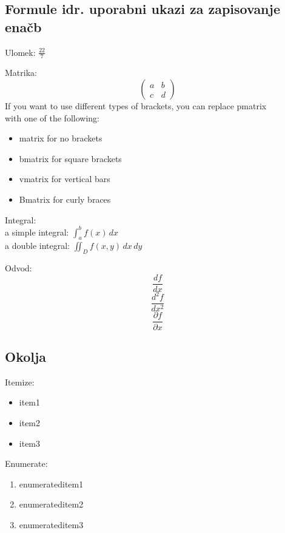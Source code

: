 \documentclass[a4paper]{article}
\begin{document}
\subsection{Formule idr. uporabni ukazi za zapisovanje enačb}
\begin{raggedright}
Ulomek: 
$\frac{22}{7}$ \\
\end{raggedright}

Matrika:
\[
\begin{pmatrix}
a & b \\
c & d
\end{pmatrix}
\]
%
%
If you want to use different types of brackets, you can replace pmatrix \\
with one of the following:
\begin{itemize}
    \item matrix for no brackets
    \item bmatrix for square brackets
    \item vmatrix for vertical bars
    \item Bmatrix for curly braces
\end{itemize} 
%
Integral: \\
a simple integral: $\int_a^b f(x) \, dx$ \\
a double integral: $ \iint_D f(x, y) \, dx \, dy$
%

\noindent Odvod: 
\[ \frac{df}{dx} \] 
\[ \frac{d^2f}{dx^2} \] 
\[ \frac{\partial f}{\partial x} \]


\subsection{Okolja}
Itemize:
\begin{itemize}
    \item item1
    \item item2
    \item item3
\end{itemize}
Enumerate:
\begin{enumerate}
    \item enumerateditem1
    \item enumerateditem2
    \item enumerateditem3
\end{enumerate}
\end{document}
